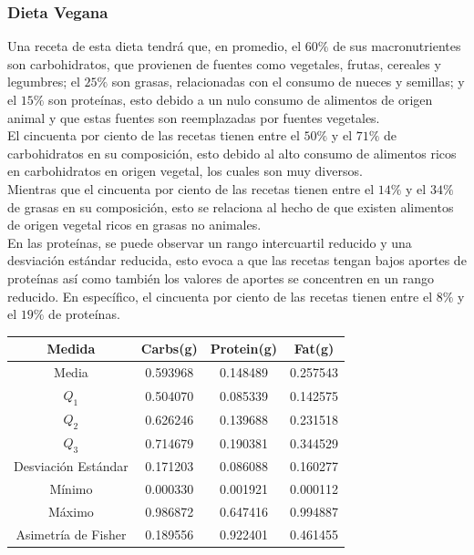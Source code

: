\documentclass[12pt,a4paper]{article}
\begin{document}
        \subsubsection{Dieta Vegana}

            Una receta de esta dieta tendrá que, en promedio, el $60\%$ de 
            sus macronutrientes son carbohidratos, que provienen de fuentes 
            como vegetales, frutas, cereales y legumbres; el $25\%$ son grasas, 
            relacionadas con el consumo de nueces y semillas; y el $15\%$ son 
            proteínas, esto debido a un nulo consumo de alimentos de origen 
            animal y que estas fuentes son reemplazadas por fuentes vegetales.\\

            El cincuenta por ciento de las recetas tienen entre el $50\%$ y el $71\%$ 
            de carbohidratos en su composición, esto debido al alto consumo de 
            alimentos ricos en carbohidratos en origen vegetal, los cuales son 
            muy diversos.\\

            Mientras que el cincuenta por ciento de las recetas tienen entre el $14\%$ y 
            el $34\%$ de grasas en su composición, esto se relaciona al hecho de que 
            existen alimentos de origen vegetal ricos en grasas no animales.\\
            
            En las proteínas, se puede observar un rango intercuartil reducido y una 
            desviación estándar reducida, esto evoca a que las recetas tengan bajos 
            aportes de proteínas así como también los valores de aportes se concentren 
            en un rango reducido. En específico, el cincuenta por ciento de las recetas 
            tienen entre el $8\%$ y el $19\%$ de proteínas.

            \begin{center}
                \begin{tabular}{|c|ccc|}
                    \hline
                    Medida & Carbs(g) & Protein(g) & Fat(g) \\
                    \hline
                    Media               & 0.593968 & 0.148489 & 0.257543  \\
                    $Q_1$               & 0.504070 & 0.085339 & 0.142575  \\
                    $Q_2$               & 0.626246 & 0.139688 & 0.231518  \\
                    $Q_3$               & 0.714679 & 0.190381 & 0.344529  \\
                    Desviación Estándar & 0.171203 & 0.086088 & 0.160277  \\
                    Mínimo              & 0.000330 & 0.001921 & 0.000112  \\
                    Máximo              & 0.986872 & 0.647416 & 0.994887  \\
                    Asimetría de Fisher & 0.189556 & 0.922401 & 0.461455  \\
                    \hline
                \end{tabular}
            \end{center}
\end{document}
